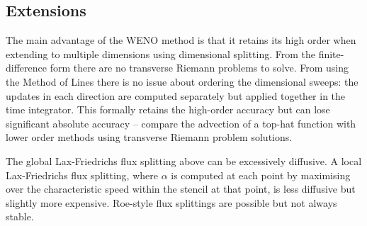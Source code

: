 \subsection{Extensions}

The main advantage of the WENO method is that it retains its high order when
extending to multiple dimensions using dimensional splitting. From the
finite-difference form there are no transverse Riemann problems to solve. From
using the Method of Lines there is no issue about ordering the dimensional
sweeps: the updates in each direction are computed separately but applied
together in the time integrator. This formally retains the high-order accuracy
but can lose significant absolute accuracy -- compare the advection of a
top-hat function with lower order methods using transverse Riemann problem
solutions.

The global Lax-Friedrichs flux splitting above can be excessively diffusive. A
local Lax-Friedrichs flux splitting, where $\alpha$ is computed at each point
by maximising over the characteristic speed within the stencil at that point, is
less diffusive but slightly more expensive. Roe-style flux splittings are
possible but not always stable.

